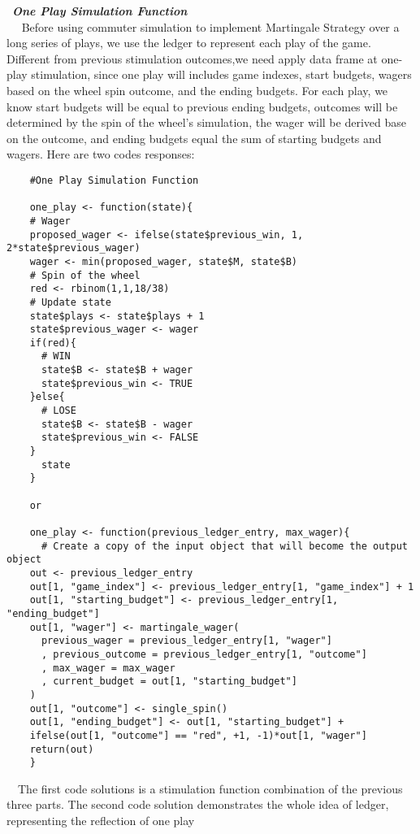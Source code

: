 \documentclass[
]{article}
\begin{document}
 \textbf{\emph{One Play Simulation Function}}\\

  Before using commuter simulation to implement Martingale Strategy over
a long series of plays, we use the ledger to represent each play of the
game. Different from previous stimulation outcomes,we need apply data
frame at one-play stimulation, since one play will includes game
indexes, start budgets, wagers based on the wheel spin outcome, and the
ending budgets. For each play, we know start budgets will be equal to
previous ending budgets, outcomes will be determined by the spin of the
wheel's simulation, the wager will be derived base on the outcome, and
ending budgets equal the sum of starting budgets and wagers. Here are
two codes responses:

\begin{verbatim}
    #One Play Simulation Function
    
    one_play <- function(state){
    # Wager
    proposed_wager <- ifelse(state$previous_win, 1, 2*state$previous_wager)
    wager <- min(proposed_wager, state$M, state$B)
    # Spin of the wheel
    red <- rbinom(1,1,18/38)
    # Update state
    state$plays <- state$plays + 1
    state$previous_wager <- wager
    if(red){
      # WIN
      state$B <- state$B + wager
      state$previous_win <- TRUE
    }else{
      # LOSE
      state$B <- state$B - wager
      state$previous_win <- FALSE
    }
      state
    }
    
    or
    
    one_play <- function(previous_ledger_entry, max_wager){
      # Create a copy of the input object that will become the output object
    out <- previous_ledger_entry
    out[1, "game_index"] <- previous_ledger_entry[1, "game_index"] + 1
    out[1, "starting_budget"] <- previous_ledger_entry[1, "ending_budget"]
    out[1, "wager"] <- martingale_wager(
      previous_wager = previous_ledger_entry[1, "wager"]
      , previous_outcome = previous_ledger_entry[1, "outcome"]
      , max_wager = max_wager
      , current_budget = out[1, "starting_budget"]
    )
    out[1, "outcome"] <- single_spin()
    out[1, "ending_budget"] <- out[1, "starting_budget"] + 
    ifelse(out[1, "outcome"] == "red", +1, -1)*out[1, "wager"]
    return(out)
    }
\end{verbatim}

 The first code solutions is a stimulation function combination of the
previous three parts. The second code solution demonstrates the whole
idea of ledger, representing the reflection of one play
\end{document}
